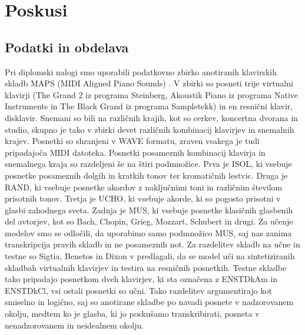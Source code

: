 \documentclass[a4paper, 12pt, openright]{book}
\begin{document}
\chapter{Poskusi}
\label{ch:work}

\section{Podatki in obdelava}
\label{ch:preprocessing}

Pri diplomski nalogi smo uporabili podatkovno zbirko anotiranih klavirskih skladb MAPS (MIDI Aligned Piano Sounds) \cite{maps}.
V zbirki so posneti trije virtualni klavirji (The Grand 2 iz programa Steinberg, Akoustik Piano iz programa Native Instruments in The Black Grand iz programa Sampletekk) in en resnični klavir, disklavir.
Snemani so bili na različnih krajih, kot so cerkev, koncertna dvorana in studio, skupno je tako v zbirki devet različnih kombinacij klavirjev in snemalnih krajev.
Posnetki so shranjeni v WAVE formatu, zraven vsakega je tudi pripadajoča MIDI datoteka.
Posnetki posameznih kombinacij klavirja in snemalnega kraja so razdeljeni še na štiri podmnožice.
Prva je ISOL, ki vsebuje posnetke posameznih dolgih in kratkih tonov ter kromatičnih lestvic.
Druga je RAND, ki vsebuje posnetke akordov z naključnimi toni in različnim številom prisotnih tonov.
Tretja je UCHO, ki vsebuje akorde, ki so pogosto prisotni v glasbi zahodnega sveta.
Zadnja je MUS, ki vsebuje posnetke klasičnih glasbenih del avtorjev, kot so Bach, Chopin, Grieg, Mozzart, Schubert in drugi.
Za učenje modelov smo se odločili, da uporabimo samo podmnožico MUS, saj nas zanima transkripcija pravih skladb in ne posameznih not.
Za razdelitev skladb na učne in testne so Sigtia, Benetos in Dixon v \cite{sigtia2016endtoend} predlagali, da se model uči na sintetiziranih skladbah virtualnih klavirjev in testira na resničnih posnetkih.
Testne skladbe tako pripadajo posnetkom dveh klavirjev, ki sta označena z ENSTDkAm in ENSTDkCl, vsi ostali posnetki so učni.
Tako razdelitev argumentirajo kot smiselno in logično, saj so anotirane skladbe po navadi posnete v nadzorovanem okolju, medtem ko je glasba, ki jo poskušamo transkribirati, posneta v nenadzorovanem in neidealnem okolju.
\end{document}
